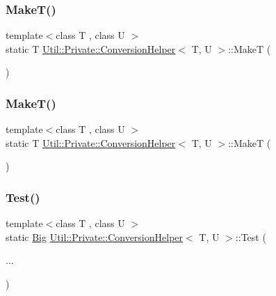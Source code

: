 \subsubsection{\texorpdfstring{MakeT()}{MakeT()}\hspace{0.1cm}{\footnotesize\ttfamily [1/2]}}
{\footnotesize\ttfamily template$<$class T , class U $>$ \\
static T \mbox{\hyperlink{structUtil_1_1Private_1_1ConversionHelper}{Util\+::\+Private\+::\+Conversion\+Helper}}$<$ T, U $>$\+::MakeT (\begin{DoxyParamCaption}{ }\end{DoxyParamCaption})\hspace{0.3cm}{\ttfamily [static]}}

\mbox{\label{structUtil_1_1Private_1_1ConversionHelper_a5515ec18074242f117a5a1cf91ca3a7d}} 
\subsubsection{\texorpdfstring{MakeT()}{MakeT()}\hspace{0.1cm}{\footnotesize\ttfamily [2/2]}}
{\footnotesize\ttfamily template$<$class T , class U $>$ \\
static T \mbox{\hyperlink{structUtil_1_1Private_1_1ConversionHelper}{Util\+::\+Private\+::\+Conversion\+Helper}}$<$ T, U $>$\+::MakeT (\begin{DoxyParamCaption}{ }\end{DoxyParamCaption})\hspace{0.3cm}{\ttfamily [static]}}

\mbox{\label{structUtil_1_1Private_1_1ConversionHelper_a70eb55dfb70dbf3459524083d35e350b}} 
\subsubsection{\texorpdfstring{Test()}{Test()}\hspace{0.1cm}{\footnotesize\ttfamily [1/4]}}
{\footnotesize\ttfamily template$<$class T , class U $>$ \\
static \mbox{\hyperlink{structUtil_1_1Private_1_1ConversionHelper_1_1Big}{Big}} \mbox{\hyperlink{structUtil_1_1Private_1_1ConversionHelper}{Util\+::\+Private\+::\+Conversion\+Helper}}$<$ T, U $>$\+::Test (\begin{DoxyParamCaption}\item[{}]{... }\end{DoxyParamCaption})\hspace{0.3cm}{\ttfamily [static]}}

